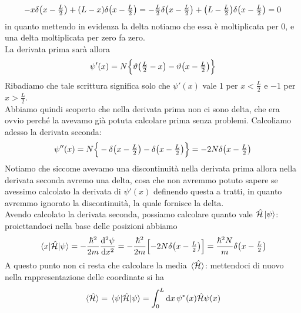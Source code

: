 \begin{soluzione}
   \begin{equation*}
      \textstyle
      - x\delta\qty( x - \frac{L}{2} ) + (L - x)\delta\qty( x - \frac{L}{2} )
      =- \frac{L}{2}\delta\qty( x - \frac{L}{2} ) + \qty(L - \frac{L}{2})\delta\qty( x - \frac{L}{2} )
      =0
   \end{equation*}
   in quanto mettendo in evidenza la delta notiamo che essa è moltiplicata per $0$, e una delta moltiplicata per zero fa zero.\\
   La derivata prima sarà allora
   \begin{equation*}
      \psi'(x)=N\Big\{ \vartheta\qty( \textstyle \frac{L}{2} \displaystyle - x ) - \vartheta\qty( x - \textstyle \frac{L}{2} \displaystyle) \Big\}
   \end{equation*}
   Ribadiamo che tale scrittura significa solo che $\psi'(x)$ vale 1 per $x<\frac{L}{2}$ e $-1$ per $x>\frac{L}{2}$.\\
   Abbiamo quindi scoperto che nella derivata prima non ci sono delta, che era ovvio perché la avevamo già potuta calcolare prima senza problemi. Calcoliamo adesso la derivata seconda:
   \begin{equation*}
      \psi''(x)
      =N \Big\{ \textstyle -\delta\qty( x - \frac{L}{2} ) - \delta\qty( x - \frac{L}{2} ) \Big\}
      =-2N\delta\qty( x - \frac{L}{2} )
   \end{equation*}
   Notiamo che siccome avevamo una discontinuità nella derivata prima allora nella derivata seconda avremo una delta, cosa che non avremmo potuto sapere se avessimo calcolato la derivata di $\psi'(x)$ definendo questa a tratti, in quanto avremmo ignorato la discontinuità, la quale fornisce la delta.\\
   Avendo calcolato la derivata seconda, possiamo calcolare quanto vale $\hat{\mathcal{H}}\ket*{\psi}$: proiettandoci nella base delle posizioni abbiamo
   \begin{equation*}
      \mel*{x}{\hat{\mathcal{H}}}{\psi}
      =-\frac{\hbar^2}{2m}\dv[2]{\psi}{x}
      =-\frac{\hbar^2}{2m} \Bigl[-2N\delta\qty( x - \textstyle \frac{L}{2} ) \Bigr]
      =\frac{\hbar^2N}{m} \delta\qty( x - \textstyle \frac{L}{2} )
   \end{equation*}
   A questo punto non ci resta che calcolare la media $\expval*{\hat{\mathcal{H}}}$: mettendoci di nuovo nella rappresentazione delle coordinate si ha
   \begin{equation*}
      \expval*{\hat{\mathcal{H}}}
      =\mel*{\psi}{\hat{\mathcal{H}}}{\psi}
      =\int_{0}^{L} \dd{x} \psi^*(x) \hat{\mathcal{H}} \psi(x)

\end{equation*}
\end{soluzione}

